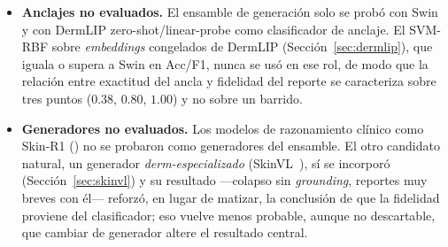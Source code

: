 \documentclass[11pt, a4paper]{article}
\begin{document}
\begin{itemize}[leftmargin=1.6em]
  la fidelidad del ensamble, la mejora de $0.82$ a $0.94$ en \emph{diagnostic consistency} no debe leerse
  como transferible a una población distinta de la evaluada.
  \item \textbf{Anclajes no evaluados.} El ensamble de generación solo se probó con Swin y con DermLIP
  zero-shot/linear-probe como clasificador de anclaje. El SVM-RBF sobre \emph{embeddings} congelados de
  DermLIP (Sección~\ref{sec:dermlip}), que iguala o supera a Swin en Acc/F1, nunca se usó en ese rol, de
  modo que la relación entre exactitud del ancla y fidelidad del reporte se caracteriza sobre tres puntos
  ($0.38$, $0.80$, $1.00$) y no sobre un barrido.
  \item \textbf{Generadores no evaluados.} Los modelos de razonamiento clínico como
  Skin-R1 (\cite{liu2025skinr1}) no se probaron como generadores del ensamble. El otro candidato natural, un
  generador \emph{derm-especializado} (SkinVL~\cite{zeng2025mmskin}), sí se incorporó
  (Sección~\ref{sec:skinvl}) y su resultado —colapso sin \emph{grounding}, reportes muy breves con él—
  reforzó, en lugar de matizar, la conclusión de que la fidelidad proviene del clasificador; eso vuelve
  menos probable, aunque no descartable, que cambiar de generador altere el resultado central.
\end{itemize}

\printbibliography
\end{document}

